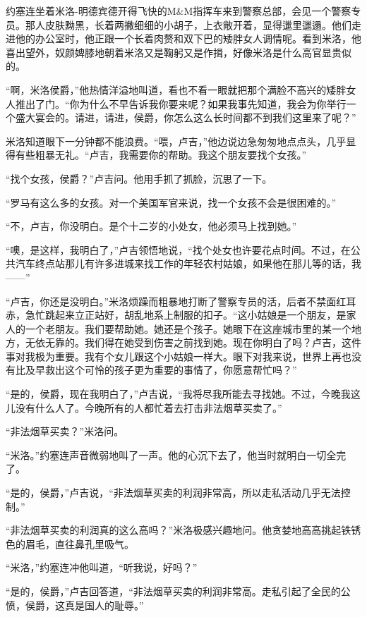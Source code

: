     约塞连坐着米洛-明德宾德开得飞快的M&M指挥车来到警察总部，会见一个警察专员。那人皮肤黝黑，长着两撇细细的小胡子，上衣敞开着，显得邋里邋遢。他们走进他的办公室时，他正跟一个长着肉赘和双下巴的矮胖女人调情呢。看到米洛，他喜出望外，奴颜婢膝地朝着米洛又是鞠躬又是作揖，好像米洛是什么高官显贵似的。

    “啊，米洛侯爵，”他热情洋溢地叫道，看也不看一眼就把那个满脸不高兴的矮胖女人推出了门。“你为什么不早告诉我你要来呢？如果我事先知道，我会为你举行一个盛大宴会的。请进，请进，侯爵，你怎么这么长时间都不到我们这里来了呢？”

    米洛知道眼下一分钟都不能浪费。“喂，卢吉，”他边说边急匆匆地点点头，几乎显得有些粗暴无礼。“卢吉，我需要你的帮助。我这个朋友要找个女孩。”

    “找个女孩，侯爵？”卢吉问。他用手抓了抓脸，沉思了一下。

    “罗马有这么多的女孩。对一个美国军官来说，找一个女孩不会是很困难的。”

    “不，卢吉，你没明白。是个十二岁的小处女，他必须马上找到她。”

    “噢，是这样，我明白了，”卢吉领悟地说，“找个处女也许要花点时间。不过，在公共汽车终点站那儿有许多进城来找工作的年轻农村姑娘，如果他在那儿等的话，我——”

    “卢吉，你还是没明白。”米洛烦躁而粗暴地打断了警察专员的活，后者不禁面红耳赤，急忙跳起来立正站好，胡乱地系上制服的扣子。“这小姑娘是一个朋友，是家人的一个老朋友。我们要帮助她。她还是个孩子。她眼下在这座城市里的某一个地方，无依无靠的。我们得在她受到伤害之前找到她。现在你明白了吗？卢吉，这件事对我极为重要。我有个女儿跟这个小姑娘一样大。眼下对我来说，世界上再也没有比及早救出这个可怜的孩子更为重要的事情了，你愿意帮忙吗？”
 


    “是的，侯爵，现在我明白了，”卢吉说，“我将尽我所能去寻找她。不过，今晚我这儿没有什么人了。今晚所有的人都忙着去打击非法烟草买卖了。”

    “非法烟草买卖？”米洛问。

    “米洛。”约塞连声音微弱地叫了一声。他的心沉下去了，他当时就明白一切全完了。

    “是的，侯爵，”卢吉说，“非法烟草买卖的利润非常高，所以走私活动几乎无法控制。”

    “非法烟草买卖的利润真的这么高吗？”米洛极感兴趣地问。他贪婪地高高挑起铁锈色的眉毛，直往鼻孔里吸气。

    “米洛，”约塞连冲他叫道，“听我说，好吗？”

    “是的，侯爵，”卢吉回答道，“非法烟草买卖的利润非常高。走私引起了全民的公愤，侯爵，这真是国人的耻辱。”

